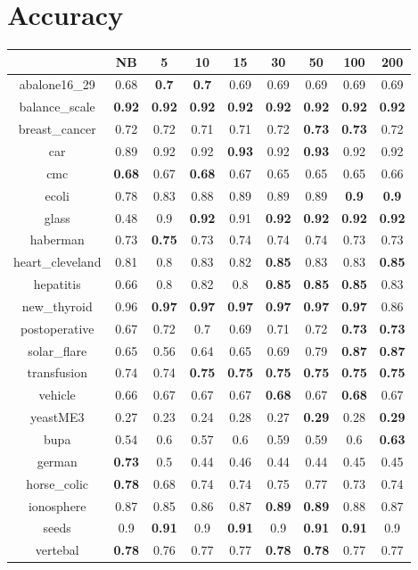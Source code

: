 \documentclass{article}%
\begin{document}
%
\normalsize%
\section*{Accuracy}%
\begin{tabular}{c|cccccccc}%
\hline%
&NB&5&10&15&30&50&100&200\\%
\hline%
abalone16\_29&0.68&\textbf{0.7}&\textbf{0.7}&0.69&0.69&0.69&0.69&0.69\\%
\hline%
balance\_scale&\textbf{0.92}&\textbf{0.92}&\textbf{0.92}&\textbf{0.92}&\textbf{0.92}&\textbf{0.92}&\textbf{0.92}&\textbf{0.92}\\%
\hline%
breast\_cancer&0.72&0.72&0.71&0.71&0.72&\textbf{0.73}&\textbf{0.73}&0.72\\%
\hline%
car&0.89&0.92&0.92&\textbf{0.93}&0.92&\textbf{0.93}&0.92&0.92\\%
\hline%
cmc&\textbf{0.68}&0.67&\textbf{0.68}&0.67&0.65&0.65&0.65&0.66\\%
\hline%
ecoli&0.78&0.83&0.88&0.89&0.89&0.89&\textbf{0.9}&\textbf{0.9}\\%
\hline%
glass&0.48&0.9&\textbf{0.92}&0.91&\textbf{0.92}&\textbf{0.92}&\textbf{0.92}&\textbf{0.92}\\%
\hline%
haberman&0.73&\textbf{0.75}&0.73&0.74&0.74&0.74&0.73&0.73\\%
\hline%
heart\_cleveland&0.81&0.8&0.83&0.82&\textbf{0.85}&0.83&0.83&\textbf{0.85}\\%
\hline%
hepatitis&0.66&0.8&0.82&0.8&\textbf{0.85}&\textbf{0.85}&\textbf{0.85}&0.83\\%
\hline%
new\_thyroid&0.96&\textbf{0.97}&\textbf{0.97}&\textbf{0.97}&\textbf{0.97}&\textbf{0.97}&\textbf{0.97}&0.86\\%
\hline%
postoperative&0.67&0.72&0.7&0.69&0.71&0.72&\textbf{0.73}&\textbf{0.73}\\%
\hline%
solar\_flare&0.65&0.56&0.64&0.65&0.69&0.79&\textbf{0.87}&\textbf{0.87}\\%
\hline%
transfusion&0.74&0.74&\textbf{0.75}&\textbf{0.75}&\textbf{0.75}&\textbf{0.75}&\textbf{0.75}&\textbf{0.75}\\%
\hline%
vehicle&0.66&0.67&0.67&0.67&\textbf{0.68}&0.67&\textbf{0.68}&0.67\\%
\hline%
yeastME3&0.27&0.23&0.24&0.28&0.27&\textbf{0.29}&0.28&\textbf{0.29}\\%
\hline%
bupa&0.54&0.6&0.57&0.6&0.59&0.59&0.6&\textbf{0.63}\\%
\hline%
german&\textbf{0.73}&0.5&0.44&0.46&0.44&0.44&0.45&0.45\\%
\hline%
horse\_colic&\textbf{0.78}&0.68&0.74&0.74&0.75&0.77&0.73&0.74\\%
\hline%
ionosphere&0.87&0.85&0.86&0.87&\textbf{0.89}&\textbf{0.89}&0.88&0.87\\%
\hline%
seeds&0.9&\textbf{0.91}&0.9&\textbf{0.91}&0.9&\textbf{0.91}&\textbf{0.91}&0.9\\%
\hline%
vertebal&\textbf{0.78}&0.76&0.77&0.77&\textbf{0.78}&\textbf{0.78}&0.77&0.77\\%
\hline%
\end{tabular}
\end{document}
